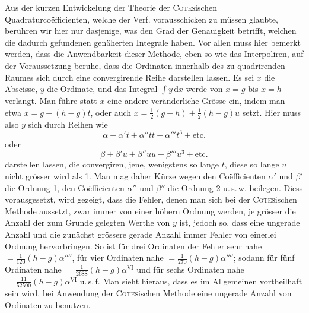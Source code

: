 Aus der kurzen Entwickelung der Theorie der \textsc{Cotes}ischen Quadraturcoëfficienten,
welche der Verf. vorausschicken zu müssen glaubte, berühren wir hier
nur dasjenige, was den Grad der Genauigkeit betrifft, welchen die dadurch gefundenen
genäherten Integrale haben. Vor allen muss hier bemerkt werden, dass
die Anwendbarkeit dieser Methode, eben so wie das Interpoliren, auf der Voraussetzung
beruhe, dass die Ordinaten innerhalb des zu quadrirenden Raumes
sich durch eine convergirende Reihe darstellen lassen. Es sei \(x\) die Abscisse, \(y\)
die Ordinate, und das Integral \(\int y\,\mathrm{d}x\) werde von \(x=g\) bis \(x=h\) verlangt.
Man führe statt \(x\) eine andere veränderliche Grösse ein, indem man etwa
\(x=g+(h-g)t\), oder auch \(x=\frac12(g+h)+\frac12(h-g)u\) setzt. Hier muss also
\(y\) sich durch Reihen wie
\[
\alpha+\alpha't+\alpha''tt+\alpha'''t^3+\text{etc.}
\]
oder
\[
\beta+\beta'u+\beta''uu+\beta'''u^3+\text{etc.}
\]
darstellen lassen, die convergiren, jene, wenigstens so lange \(t\), diese so lange \(u\)
nicht grösser wird als 1. Man mag daher Kürze wegen den Coëfficienten \(\alpha'\) und \(\beta'\)
die Ordnung 1, den Coëfficienten \(\alpha''\) und \(\beta''\) die Ordnung 2 u.\,s.\,w. beilegen. Diess
vorausgesetzt, wird gezeigt, dass die Fehler, denen man sich bei der \textsc{Cotes}ischen
Methode aussetzt, zwar immer von einer höhern Ordnung werden, je grösser die
Anzahl der zum Grunde gelegten Werthe von \(y\) ist, jedoch so, dass eine ungerade
Anzahl und die zunächst grössere gerade Anzahl immer Fehler von einerlei
Ordnung hervorbringen. So ist für drei Ordinaten der Fehler sehr nahe
\(=\frac{1}{120}(h-g)\alpha''''\), für vier Ordinaten nahe \(=\frac{1}{270}(h-g)\alpha''''\); sodann für
fünf Ordinaten nahe \(=\frac{1}{2688}(h-g)\alpha^{\mathrm{VI}}\) und für sechs Ordinaten nahe
\(=\frac{11}{52500}(h-g)\alpha^{\mathrm{VI}}\) u.\,s.\,f. Man sieht hieraus, dass es im Allgemeinen vortheilhaft
sein wird, bei Anwendung der \textsc{Cotes}ischen Methode eine ungerade Anzahl von
Ordinaten zu benutzen.

